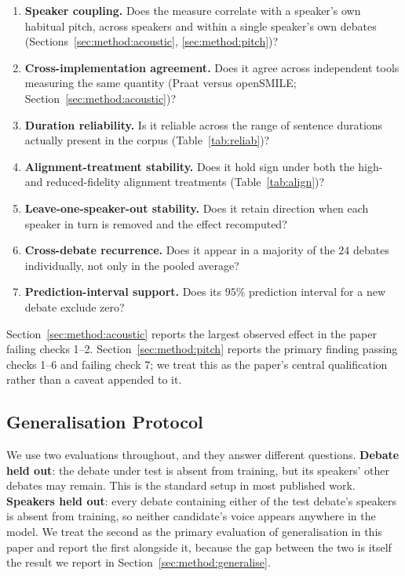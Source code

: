 \documentclass[journal]{IEEEtran}
\begin{document}
\begin{enumerate}\itemsep2pt
  \item \textbf{Speaker coupling.} Does the measure correlate with a
        speaker's own habitual pitch, across speakers and within a single
        speaker's own debates (Sections~\ref{sec:method:acoustic},
        \ref{sec:method:pitch})?
  \item \textbf{Cross-implementation agreement.} Does it agree across
        independent tools measuring the same quantity (Praat versus
        openSMILE; Section~\ref{sec:method:acoustic})?
  \item \textbf{Duration reliability.} Is it reliable across the range of
        sentence durations actually present in the corpus
        (Table~\ref{tab:reliab})?
  \item \textbf{Alignment-treatment stability.} Does it hold sign under both
        the high- and reduced-fidelity alignment treatments
        (Table~\ref{tab:align})?
  \item \textbf{Leave-one-speaker-out stability.} Does it retain direction
        when each speaker in turn is removed and the effect recomputed?
  \item \textbf{Cross-debate recurrence.} Does it appear in a majority of the
        $24$ debates individually, not only in the pooled average?
  \item \textbf{Prediction-interval support.} Does its $95\%$ prediction
        interval for a new debate exclude zero?
\end{enumerate}
Section~\ref{sec:method:acoustic} reports the largest observed effect in the
paper failing checks 1--2. Section~\ref{sec:method:pitch} reports the primary
finding passing checks 1--6 and failing check 7; we treat this as the
paper's central qualification rather than a caveat appended to it.

\subsection{Generalisation Protocol}
\label{sec:method:genprotocol}

We use two evaluations throughout, and they answer different questions.
\textbf{Debate held out}: the debate under test is absent from training, but
its speakers' other debates may remain. This is the standard setup in most
published work. \textbf{Speakers held out}: every debate containing either
of the test debate's speakers is absent from training, so neither
candidate's voice appears anywhere in the model. We treat the second as the
primary evaluation of generalisation in this paper and report the first
alongside it, because the gap between the two is itself the result we report
in Section~\ref{sec:method:generalise}.
\end{document}
